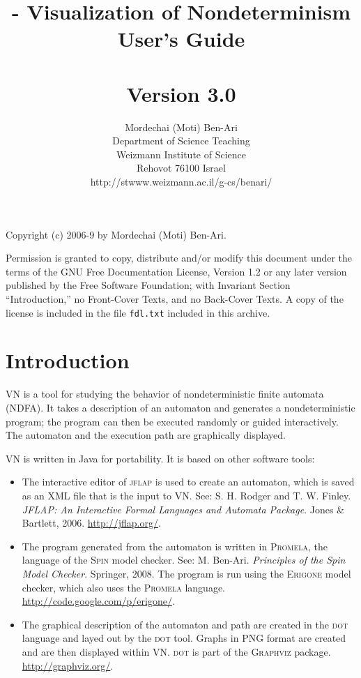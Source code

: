 \documentclass[11pt]{article}
\title{\vn{} - Visualization of Nondeterminism\\User's Guide\\\mbox{}\\\large{Version 3.0}}
\author{Mordechai (Moti) Ben-Ari\\
Department of Science Teaching\\
Weizmann Institute of Science\\
Rehovot 76100 Israel\\
\textsf{http://stwww.weizmann.ac.il/g-cs/benari/}}
\newcommand{\vn}{\textsc{VN}}
\newcommand{\jf}{\textsc{jflap}}
\newcommand{\dt}{\textsc{dot}}
\newcommand{\spn}{\textsc{Spin}}
\newcommand{\prm}{\textsc{Promela}}
\newcommand{\erg}{\textsc{Erigone}}
\newcommand{\p}[1]{\texttt{#1}}
\begin{document}
\maketitle
\thispagestyle{empty}

\vfil

\begin{center}
Copyright (c) 2006-9 by Mordechai (Moti) Ben-Ari.
\end{center}
Permission is granted to copy, distribute and/or modify this document
under the terms of the GNU Free Documentation License, Version 1.2
or any later version published by the Free Software Foundation;
with Invariant Section ``Introduction,'' no Front-Cover Texts, and no Back-Cover Texts.
A copy of the license is included in the file \p{fdl.txt}
included in this archive.
\vfil

\newpage

\section{Introduction}

\vn{} is a tool for studying the behavior of nondeterministic finite automata 
(NDFA). It takes a description of an automaton and generates a nondeterministic 
program; the program can then be executed randomly or guided interactively. The 
automaton and the execution path are graphically displayed.

\vn{} is written in Java for portability. It is based on other software tools: 
\begin{itemize}
\item The interactive editor of \jf{} is used to 
create an automaton, which is saved as an XML file that is the input to \vn{}. See: 
S. H. Rodger and T. W. Finley. \textit{JFLAP: An Interactive Formal 
Languages and Automata Package}. Jones \& Bartlett, 2006. \url{http://jflap.org/}.
\item The program generated from the automaton is written in 
\prm{}, the language of the \spn{} model checker. See: M. Ben-Ari. 
\textit{Principles of the Spin Model Checker}. Springer, 2008.
The program is run using the \erg{} model checker, which also uses
the \prm{} language. \url{http://code.google.com/p/erigone/}.
\item The graphical description of the automaton and path are created in the \dt{} 
language and layed out by the \dt{} tool. Graphs in PNG format are created and
are then displayed within \vn{}. \dt{} is part of the \textsc{Graphviz} 
package. \url{http://graphviz.org/}.
\end{itemize}
\end{document}
